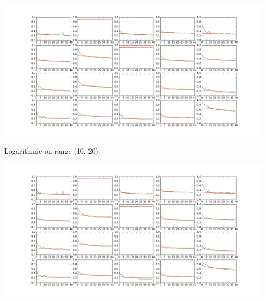 \documentclass[a4paper,10pt]{article}
\begin{document}
\includegraphics[width=\textwidth]{../../figures/regression_20_lin}

Logarithmic on range (10, 20):

\includegraphics[width=\textwidth]{../../figures/regression_20_log}
\end{document}
